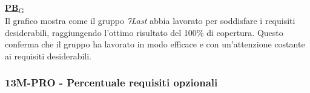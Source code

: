 \begin{flushleft}
\href{https://7last.github.io/docs/pb/documentazione-interna/glossario\#product-baseline}{\textbf{PB}\textsubscript{G}} \\
Il grafico mostra come il gruppo \textit{7Last} abbia lavorato per soddisfare i requisiti desiderabili, raggiungendo l'ottimo risultato del 100\% di copertura. Questo conferma che il gruppo ha lavorato in modo efficace e con un'attenzione costante ai requisiti desiderabili.
\end{flushleft}

\newpage
\subsubsection{13M-PRO - Percentuale requisiti opzionali}
